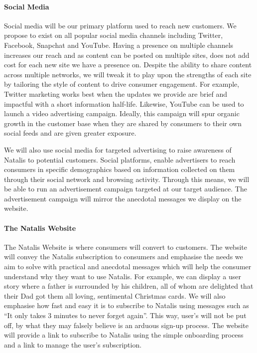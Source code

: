\documentclass[10pt,a4paper]{article}
\begin{document}
\paragraph*{Social Media}
Social media will be our primary platform used to reach new customers. We propose to exist on all popular social media channels including Twitter, Facebook, Snapchat and YouTube. Having a presence on multiple channels increases our reach and as content can be posted on multiple sites, does not add cost for each new site we have a presence on. Despite the ability to share content across multiple networks, we will tweak it to play upon the strengths of each site by tailoring the style of content to drive consumer engagement. For example, Twitter marketing works best when the updates we provide are brief and impactful with a short information half-life. Likewise, YouTube can be used to launch a video advertising campaign. Ideally, this campaign will spur organic growth in the customer base when they are shared by consumers to their own social feeds and are given greater exposure.

We will also use social media for targeted advertising to raise awareness of Natalis to potential customers. Social platforms, enable advertisers to reach consumers in specific demographics based on information collected on them through their social network and browsing activity. Through this means, we will be able to run an advertisement campaign targeted at our target audience. The advertisement campaign will mirror the anecdotal messages we display on the website.

\paragraph*{The Natalis Website}
The Natalis Website is where consumers will convert to customers. The website will convey the Natalis subscription to consumers and emphasise the needs we aim to solve with practical and anecdotal messages which will help the consumer understand why they want to use Natalis. For example, we can display a user story where a father is surrounded by his children, all of whom are delighted that their Dad got them all loving, sentimental Christmas cards. We will also emphasise how fast and easy it is to subscribe to Natalis using messages such as ``It only takes 3 minutes to never forget again''. This way, user's will not be put off, by what they may falsely believe is an arduous sign-up process. The website will provide a link to subscribe to Natalis using the simple onboarding process and a link to manage the user's subscription.
\end{document}
